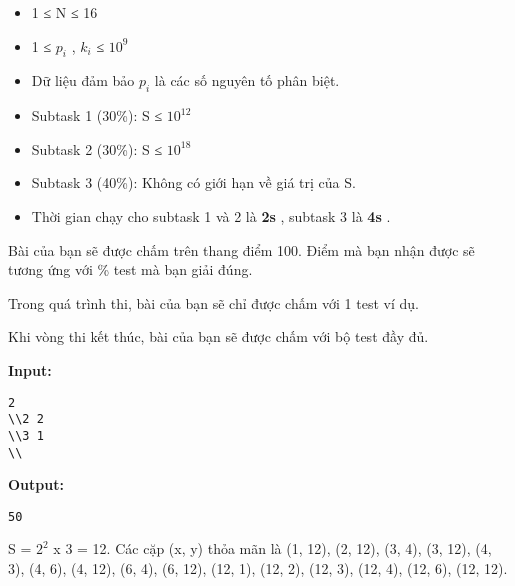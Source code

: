 \begin{itemize}
	\item     1 ≤ N ≤ 16   
	\item     1 ≤ $p_{i}$    , $k_{i}$    ≤ $10^{9}$
	\item     Dữ liệu đảm bảo $p_{i}$    là các số nguyên tố phân biệt.   
	\item     Subtask 1 (30\%): S ≤ $10^{12}$
	\item     Subtask 2 (30\%): S ≤ $10^{18}$
	\item     Subtask 3 (40\%): Không có giới hạn về giá trị của S.   
	\item     Thời gian chạy cho subtask 1 và 2 là    \textbf{     2s    }    , subtask 3 là    \textbf{     4s    }    .   
\end{itemize}
Bài của bạn sẽ được chấm trên thang điểm 100. Điểm mà bạn nhận được sẽ tương ứng với \% test mà bạn giải đúng.  

   Trong quá trình thi, bài của bạn sẽ chỉ được chấm với 1 test ví dụ.  

   Khi vòng thi kết thúc, bài của bạn sẽ được chấm với bộ test đầy đủ.  
\begin{itemize}
\end{itemize}
\begin{itemize}
\end{itemize}
\textbf{    Input:   }
\begin{verbatim}
2
\\2 2
\\3 1 
\\\end{verbatim}

\textbf{    Output:   }
\begin{verbatim}
50
\end{verbatim}
S = $2^{2}$   x 3 = 12. Các cặp (x, y) thỏa mãn là (1, 12), (2, 12), (3, 4), (3, 12), (4, 3), (4, 6), (4, 12), (6, 4), (6, 12), (12, 1), (12, 2), (12, 3), (12, 4), (12, 6), (12, 12).